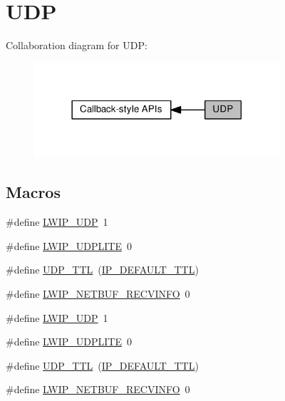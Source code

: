 \hypertarget{group__lwip__opts__udp}{}\section{U\+DP}
\label{group__lwip__opts__udp}
Collaboration diagram for U\+DP\+:
\nopagebreak
\begin{figure}[H]
\begin{center}
\leavevmode
\includegraphics[width=258pt]{group__lwip__opts__udp}
\end{center}
\end{figure}
\subsection*{Macros}
\begin{DoxyCompactItemize}
\item 
\#define \hyperlink{group__lwip__opts__udp_gab6030e96e72df649d2650fd32d7a67b3}{L\+W\+I\+P\+\_\+\+U\+DP}~1
\item 
\#define \hyperlink{group__lwip__opts__udp_ga35731bc5f337943e474a15c1cd538a61}{L\+W\+I\+P\+\_\+\+U\+D\+P\+L\+I\+TE}~0
\item 
\#define \hyperlink{group__lwip__opts__udp_ga97908a317bcba89174b5d1ccbdca0096}{U\+D\+P\+\_\+\+T\+TL}~(\hyperlink{group__lwip__opts__ipv4_ga556b9b58fd02c0fdd126791baef77411}{I\+P\+\_\+\+D\+E\+F\+A\+U\+L\+T\+\_\+\+T\+TL})
\item 
\#define \hyperlink{group__lwip__opts__udp_ga72021505969c5ce29e972486d7794baa}{L\+W\+I\+P\+\_\+\+N\+E\+T\+B\+U\+F\+\_\+\+R\+E\+C\+V\+I\+N\+FO}~0
\item 
\#define \hyperlink{group__lwip__opts__udp_gab6030e96e72df649d2650fd32d7a67b3}{L\+W\+I\+P\+\_\+\+U\+DP}~1
\item 
\#define \hyperlink{group__lwip__opts__udp_ga35731bc5f337943e474a15c1cd538a61}{L\+W\+I\+P\+\_\+\+U\+D\+P\+L\+I\+TE}~0
\item 
\#define \hyperlink{group__lwip__opts__udp_ga97908a317bcba89174b5d1ccbdca0096}{U\+D\+P\+\_\+\+T\+TL}~(\hyperlink{group__lwip__opts__ipv4_ga556b9b58fd02c0fdd126791baef77411}{I\+P\+\_\+\+D\+E\+F\+A\+U\+L\+T\+\_\+\+T\+TL})
\item 
\#define \hyperlink{group__lwip__opts__udp_ga72021505969c5ce29e972486d7794baa}{L\+W\+I\+P\+\_\+\+N\+E\+T\+B\+U\+F\+\_\+\+R\+E\+C\+V\+I\+N\+FO}~0
\end{DoxyCompactItemize}


